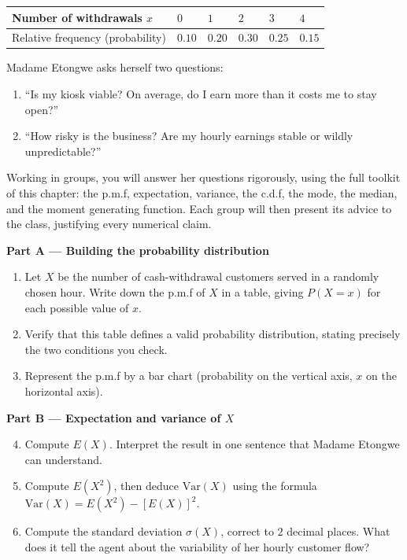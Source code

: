 \documentclass[11pt]{article}
\newcounter{popsec}
\newcounter{popsub}
\newcommand{\courssub}[1]{%
  \stepcounter{popsub}%
  \par\vspace{9pt}\noindent{\popxbold\fontsize{11.5}{13}\selectfont\color{popink}{\color{poporange}\thepopsec.\thepopsub}\hspace{6pt}#1}\par\nopagebreak\vspace{4pt}
}
\begin{document}
\begin{center}
\begin{tabularx}{\linewidth}{|l|X|X|X|X|X|}
\hline
\rowcolor{popblueL} Number of withdrawals $x$ & $0$ & $1$ & $2$ & $3$ & $4$ \\
\hline Relative frequency (probability) & $0.10$ & $0.20$ & $0.30$ & $0.25$ & $0.15$ \\
\hline
\end{tabularx}
\end{center}

Madame Etongwe asks herself two questions:
\begin{enumerate}
\item ``Is my kiosk viable? On average, do I earn more than it costs me to stay open?''
\item ``How risky is the business? Are my hourly earnings stable or wildly unpredictable?''
\end{enumerate}

Working in groups, you will answer her questions rigorously, using the full toolkit of this chapter: the p.m.f, expectation, variance, the c.d.f, the mode, the median, and the moment generating function. Each group will then present its advice to the class, justifying every numerical claim.

\courssub{Tasks}

\textbf{Part A — Building the probability distribution}\par

\begin{enumerate}
\item Let $X$ be the number of cash-withdrawal customers served in a randomly chosen hour. Write down the p.m.f of $X$ in a table, giving $P(X=x)$ for each possible value of $x$.
\item Verify that this table defines a valid probability distribution, stating precisely the two conditions you check.
\item Represent the p.m.f by a bar chart (probability on the vertical axis, $x$ on the horizontal axis).
\end{enumerate}

\textbf{Part B — Expectation and variance of $X$}\par

\begin{enumerate}
\setcounter{enumi}{3}
\item Compute $E(X)$. Interpret the result in one sentence that Madame Etongwe can understand.
\item Compute $E(X^2)$, then deduce $\mathrm{Var}(X)$ using the formula $\mathrm{Var}(X)=E(X^2)-[E(X)]^2$.
\item Compute the standard deviation $\sigma(X)$, correct to $2$ decimal places. What does it tell the agent about the variability of her hourly customer flow?
\end{enumerate}
\end{document}
